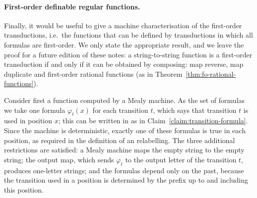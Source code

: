        

\paragraph*{First-order definable regular functions.} Finally, it would be useful to give a machine characterisation of the first-order transductions, i.e.~the functions that can be defined by \mso transductions in which all formulas are first-order. We only state the appropriate result, and we leave the proof for a future edition of these notes: 
     a string-to-string function is a first-order transduction if and only if it can be obtained by composing: map reverse, map duplicate and first-order rational functions (as in Theorem~\ref{thm:fo-rational-functions}).


\exerciseheader

 {
    Consider first a function computed by a Mealy machine. As the set of formulas we take one formula $\varphi_t(x)$ for each transition $t$, which says that transition $t$ is used in position $x$; this can be written in \mso as in Claim~\ref{claim:transition-formula}. Since the machine is deterministic, exactly one of these formulas is true in each position, as required in the definition of an \mso relabelling. The three additional restrictions are satisfied: a Mealy machine maps the empty string to the empty string; the output map, which sends $\varphi_t$ to the output letter of the transition $t$, produces one-letter strings; and the formulas depend only on the past, because the transition used in a position is determined by the prefix up to and including this position.

}
